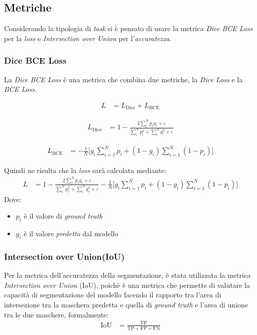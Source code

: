 


\subsection{Metriche}

Considerando la tipologia di \textit{task} si è pensato di usare la metrica \textit{Dice BCE Loss} per la \textit{loss} e \textit{Intersection over Union} per l'\textit{accuratezza}.

\subsubsection{Dice BCE Loss}
La \textit{Dice BCE Loss} è una metrica che combina due metriche, la \textit{Dice Loss} e la \textit{BCE Loss}.

\begin{align}
	L & = L_{\text{Dice}} + L_{\text{BCE}}
	\label{eq:dice_bce_loss}
\end{align}

\begin{align}
	L_{\text{Dice}} & = 1 - \frac{2\sum_i^N p_i g_i + \varepsilon}{\sum_i^N p_i^2 + \sum_i^N g_i^2 + \varepsilon}
	\label{eq:dice_loss}
\end{align}

\begin{align}
	L_{\text{BCE}} & = -\frac{1}{N} \Bigg[ g_i \sum_{i=1}^N p_i + ( 1 - g_i ) \sum_{i=1}^N (1-p_i) \Bigg]
	\label{eq:bce_loss}
\end{align}

Quindi ne risulta che la \textit{loss} sarà calcolata mediante:
\begin{align}
	L & = 1 - \frac{2\sum_i^N p_i g_i + \varepsilon}{\sum_i^N p_i^2 + \sum_i^N g_i^2 + \varepsilon} -\frac{1}{N} \Bigg[ g_i \sum_{i=1}^N p_i + ( 1 - g_i ) \sum_{i=1}^N (1-p_i) \Bigg]
	\label{eq:dice_bce_loss_complete}
\end{align}
Dove:
\begin{itemize}
	\item $p_i$ è il valore di \textit{ground truth}
	\item $g_i$ è il valore \textit{predetto} dal modello
\end{itemize}

\subsubsection{Intersection over Union(IoU)}
Per la metrica dell'accuratezza della segmentazione, è stata utilizzata la metrica \textit{Intersection over Union} (IoU),
poichè è una metrica che permette di valutare la capacità di segmentazione del modello
facendo il rapporto tra l'area di intersezione tra la maschera predetta e quella di \textit{ground truth} e l'area di unione tra le due maschere, formalmente:
\begin{align}
	\text{IoU} & = \frac{\text{TP}}{\text{TP} + \text{FP} + \text{FN}}
	\label{eq:iou}
\end{align}

